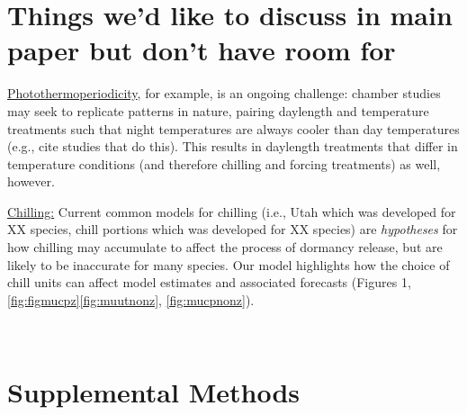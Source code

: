 \documentclass{article}
\begin{document}
\section*{Things we'd like to discuss in main paper but don't have room for}

\par \underline{Photothermoperiodicity}, for example, is an ongoing challenge: chamber studies may seek to replicate patterns in nature, pairing daylength and temperature treatments such that night temperatures are always cooler than day temperatures (e.g., cite studies that do this).  This results in daylength treatments that differ in temperature conditions (and therefore chilling and forcing treatments) as well, however.  

\par \underline{Chilling:} Current common models for chilling (i.e., Utah which was developed for XX species,  chill portions which was developed for XX species) are \emph{hypotheses} for how chilling may accumulate to affect the process of dormancy release, but are likely to be inaccurate for many species. Our model highlights how the choice of chill units can affect model estimates and associated forecasts (Figures 1,\ref{fig:figmucpz}\ref{fig:muutnonz}, \ref{fig:mucpnonz}). 

\
\section*{Supplemental Methods}
\end{document}
